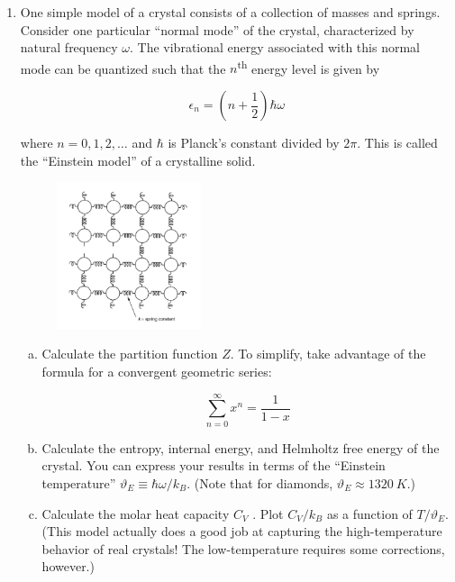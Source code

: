 \begin{enumerate}
    \pagebreak

    \item One simple model of a crystal consists of a collection of masses and springs. Consider one particular
        “normal mode” of the crystal, characterized by natural frequency $\omega$. The vibrational energy associated
        with this normal mode can be quantized such that the $n$\textsuperscript{th} energy level is given by

    \begin{equation*}
        \epsilon_n = \left(n + \frac{1}{2}\right)\hbar \omega
    \end{equation*}


    where $n = 0, 1, 2, \dots$ and $\hbar$ is Planck’s constant divided by $2\pi$. This is called the “Einstein model”
    of a crystalline solid.

    \begin{figure}[h]
        \centering
        \includegraphics[width=0.4\textwidth]{./assets/fig_2.png}
    \end{figure}
    
    \begin{enumerate}[(a)]

        \item Calculate the partition function $Z$. To simplify, take advantage of the formula for a convergent
            geometric series:

        \begin{equation*}
            \sum_{n=0}^\infty x^n = \frac{1}{1 - x}
        \end{equation*}

        \item Calculate the entropy, internal energy, and Helmholtz free energy of the crystal. 
            You can express your results in terms of the “Einstein temperature” $\vartheta_E  ≡ \hbar \omega/k_B$. 
            (Note that for diamonds, $\vartheta_E \approx \SI{1320}{K}$.)

        \item Calculate the molar heat capacity $C_V$ . Plot $C_V /k_B$ as a function of $T /\vartheta_E$. (This model actually
            does a good job at capturing the high-temperature behavior of real crystals! The low-temperature
            requires some corrections, however.)
    \end{enumerate}




    
\end{enumerate}



